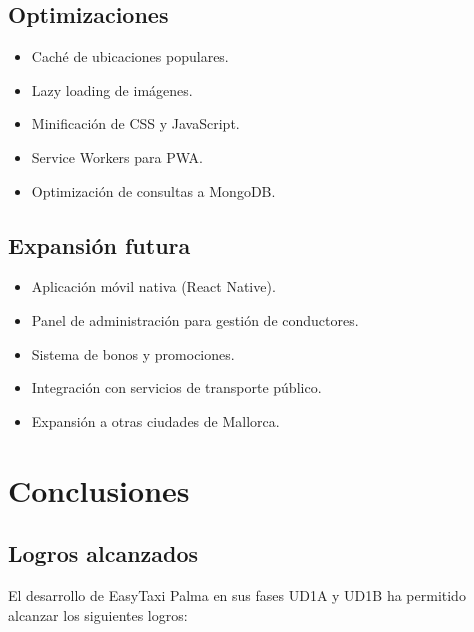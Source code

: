 \documentclass[12pt,a4paper]{article}
\begin{document}
\subsection{Optimizaciones}

\begin{itemize}
    \item Caché de ubicaciones populares.
    \item Lazy loading de imágenes.
    \item Minificación de CSS y JavaScript.
    \item Service Workers para PWA.
    \item Optimización de consultas a MongoDB.
\end{itemize}

\subsection{Expansión futura}

\begin{itemize}
    \item Aplicación móvil nativa (React Native).
    \item Panel de administración para gestión de conductores.
    \item Sistema de bonos y promociones.
    \item Integración con servicios de transporte público.
    \item Expansión a otras ciudades de Mallorca.
\end{itemize}

\newpage

\section{Conclusiones}

\subsection{Logros alcanzados}

El desarrollo de EasyTaxi Palma en sus fases UD1A y UD1B ha permitido alcanzar los siguientes logros:
\end{document}
